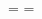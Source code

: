 \hsize 3in \vsize=1in  
\headline={\vrule width3in height12pt depth0pt}
\footline={\vrule width3in height12pt depth0pt}
\hfil\vrule width2in height1.5in\hfil
\bye

